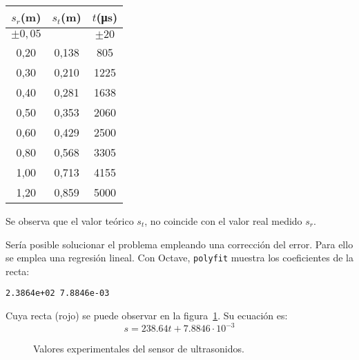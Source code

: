 \documentclass[10pt,a4paper,hidelinks,twocolumn]{article}
\begin{document}
\begin{table}[h]
\centering
\begin{tabular}{ | c | c | c | }
\hline
$s_{r}$(m) & $s_{t}$(m) & $t$(\si{\micro\second}) \\ \hline
$\pm 0,05$ &  & $\pm 20$ \\ \hline \hline
0,20 & 0,138 &  805 \\ \hline
0,30 & 0,210 & 1225 \\ \hline
0,40 & 0,281 & 1638 \\ \hline
0,50 & 0,353 & 2060 \\ \hline
0,60 & 0,429 & 2500 \\ \hline
0,80 & 0,568 & 3305 \\ \hline
1,00 & 0,713 & 4155 \\ \hline
1,20 & 0,859 & 5000 \\ \hline
\end{tabular}
\end{table}

Se observa que el valor teórico $s_t$, no coincide con el valor real medido 
$s_r$.

Sería posible solucionar el problema empleando una corrección del error. Para 
ello se emplea una regresión lineal. Con Octave, \texttt{polyfit} muestra los 
coeficientes de la recta:
\begin{center}
\texttt{2.3864e+02   7.8846e-03}
\end{center}
Cuya recta (rojo) se puede observar en la figura~\ref{fig:sonar_plot}. Su 
ecuación es:
$$s = 238.64t + 7.8846\cdot10^{-3}$$

\begin{figure}
\caption{Valores experimentales del sensor de ultrasonidos.\label{fig:sonar_plot}}
\end{figure}
\end{document}

